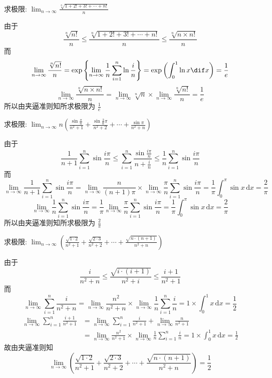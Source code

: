 \documentclass[color=green,titlestyle=hang]{elegantbook}%
\begin{document}
\begin{exercise}
求极限: $\lim_{n\to\infty}\frac{\sqrt[n]{1+2!+3!+\cdots+n!}}{n}$
\end{exercise}
\begin{solution}
由于\[\frac{\sqrt[n]{n!}}{n}\leqslant\frac{\sqrt[n]{1+2!+3!+\cdots+n!}}{n}\leqslant\frac{\sqrt[n]{n\times n!}}{n}\]
而\[\lim_{n\to\infty}\frac{\sqrt[n]{n!}}{n}
= \exp\left\{\lim\limits_{n \to \infty } \frac{1}{n}\sum\limits_{i = 1}^n {\ln\frac{i}{n}} \right\} =\exp\left(\int_0^1 {\ln x} \dif x\right)=\frac{1}{e}\]
\[\lim_{n\to\infty}\frac{\sqrt[n]{n\times n!}}{n}=\lim_{n\to\infty}\sqrt[n]{n}\times\lim_{n\to\infty}\frac{\sqrt[n]{n!}}{n}=\frac{1}{e}\]
所以由夹逼准则知所求极限为 $\frac{1}{e}$	
\end{solution}

\begin{exercise}
求极限: $\lim_{n\to\infty}n\left(\frac{\sin\frac{\pi}{n}}{n^2+1}+\frac{\sin\frac{2}{n}\pi}{n^2+2}+\cdots+\frac{\sin\pi}{n^2+n}\right)$	
\end{exercise}
\begin{solution}
由于\[\frac{1}{n+1}\sum_{i=1}^{n}\sin\frac{i\pi}{n}\leqslant\sum_{i=1}^{n}\frac{\sin\frac{i\pi}{n}}{n+\frac{i}{n}} \leqslant\frac{1}{n}\sum_{i=1}^{n}\sin\frac{i\pi}{n}\]而
\[\lim_{n\to\infty}\frac{1}{n+1}\sum_{i=1}^{n}\sin\frac{i\pi}{n}=\lim_{n\to\infty}\frac{n}{(n+1)\pi}\times\lim_{n\to\infty}\frac{\pi}{n}\sum_{i=1}^{n}\sin\frac{i\pi}{n}=\frac{1}{\pi}\int_0^\pi\sin x\,\mathrm{d}x=\frac{2}{\pi}\]
\[\lim_{n\to\infty}\frac{1}{n}\sum_{i=1}^{n}\sin\frac{i\pi}{n}=\frac{1}{\pi}\lim_{n\to\infty}\frac{\pi}{n}\sum_{i=1}^{n}\sin\frac{i\pi}{n}=\frac{1}{\pi}\int_0^\pi\sin x\,\mathrm{d}x=\frac{2}{\pi}\]
所以由夹逼准则知所求极限为 $\frac{2}{\pi}$
\end{solution}

\begin{exercise}
求极限: $\lim_{n\to\infty}\left(\frac{\sqrt{1\cdot2}}{n^2+1}+\frac{\sqrt{2\cdot3}}{n^2+2}+\cdots+\frac{\sqrt{n\cdot(n+1)}}{n^2+n}\right)$
\end{exercise}\begin{solution}
由于\[\frac{i}{n^2+n}\leqslant\frac{\sqrt{i\cdot(i+1)}}{n^2+i}\leqslant\frac{i+1}{n^2+1}\]
而
\[\lim_{n\to\infty}\sum_{i=1}^{n}\frac{i}{n^2+n}=\lim_{n\to\infty}\frac{n^2}{n^2+n}\times\lim_{n\to\infty}\frac{1}{n}\sum_{i=1}^{n}\frac{i}{n}=1\times\int_0^1 x\,\mathrm{d}x=\frac{1}{2}\]
\begin{align*}
\lim_{n\to\infty}\sum_{i=1}^{n}\frac{i+1}{n^2+1}
&=\lim_{n\to\infty}\sum_{i=1}^{n}\frac{i}{n^2+1}+\lim_{n\to\infty}\frac{n}{n^2+1}\\
&=\lim_{n\to\infty}\frac{n^2}{n^2+1}\times\lim_{n\to\infty}\frac{1}{n}\sum_{i=1}^{n}\frac{i}{n}=1\times\int_0^1 x\,\mathrm{d}x=\frac{1}{2}
\end{align*}
故由夹逼准则知
\begin{equation*}\lim_{n\to\infty}\left(\frac{\sqrt{1\cdot2}}{n^2+1}+\frac{\sqrt{2\cdot3}}{n^2+2}+\cdots+\frac{\sqrt{n\cdot(n+1)}}{n^2+n}\right)=\frac{1}{2}\end{equation*}	
\end{solution}
\end{document}
